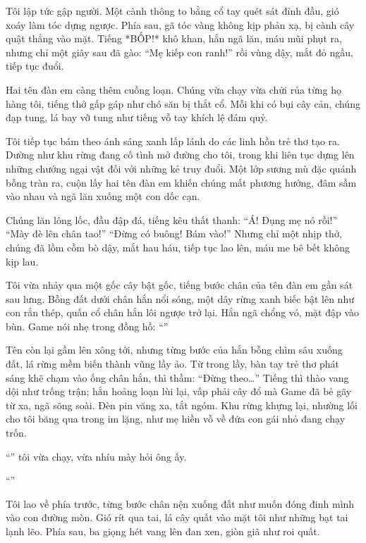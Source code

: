 \documentclass[../main.tex]{subfiles}
\begin{document}
Tôi lập tức gập người. Một cành thông to bằng cổ tay quét sát đỉnh đầu, gió xoáy làm tóc dựng ngược. Phía sau, gã tóc vàng không kịp phản xạ, bị cành cây quật thẳng vào mặt. Tiếng *BỐP!* khô khan, hắn ngã lăn, máu mũi phụt ra, nhưng chỉ một giây sau đã gào: ``Mẹ kiếp con ranh!'' rồi vùng dậy, mắt đỏ ngầu, tiếp tục đuổi.

Hai tên đàn em càng thêm cuồng loạn. Chúng vừa chạy vừa chửi rủa từng họ hàng tôi, tiếng thở gấp gáp như chó săn bị thắt cổ. Mỗi khi có bụi cây cản, chúng đạp tung, lá bay vỡ tung như tiếng vỗ tay khích lệ đám quỷ.

Tôi tiếp tục bám theo ánh sáng xanh lấp lánh do các linh hồn trẻ thơ tạo ra. Dường như khu rừng đang cố tình mở đường cho tôi, trong khi liên tục dựng lên những chướng ngại vật đối với những kẻ truy đuổi. Một lớp sương mù đặc quánh bỗng tràn ra, cuộn lấy hai tên đàn em khiến chúng mất phương hướng, đâm sầm vào nhau và ngã lăn xuống một con dốc cạn.

Chúng lăn lông lốc, đầu đập đá, tiếng kêu thất thanh: ``Á! Đụng mẹ nó rồi!'' ``Mày đè lên chân tao!'' ``Đừng có buông! Bám vào!'' Nhưng chỉ một nhịp thở, chúng đã lồm cồm bò dậy, mắt hau háu, tiếp tục lao lên, máu me bê bết không kịp lau.

Tôi vừa nhảy qua một gốc cây bật gốc, tiếng bước chân của tên đàn em gần sát sau lưng. Bỗng đất dưới chân hắn nổi sóng, một dây rừng xanh biếc bật lên như con rắn thép, quấn cổ chân hắn lôi ngược trở lại. Hắn ngã chổng vó, mặt đập vào bùn. Game nói nhẹ trong đồng hồ: ``''

Tên còn lại gầm lên xông tới, nhưng từng bước của hắn bỗng chìm sâu xuống đất, lá rừng mềm biến thành vũng lầy ảo. Từ trong lầy, bàn tay trẻ thơ phát sáng khẽ chạm vào ống chân hắn, thì thầm: ``Đừng theo\dots'' Tiếng thì thào vang dội như trống trận; hắn hoảng loạn lùi lại, vấp phải cây đổ mà Game đã bẻ gãy từ xa, ngã sõng soài. Đèn pin văng xa, tắt ngóm. Khu rừng khựng lại, nhường lối cho tôi băng qua trong im lặng, như mẹ hiền vỗ về đứa con gái nhỏ đang chạy trốn.

``'' tôi vừa chạy, vừa nhíu mày hỏi ông ấy.

``''

Tôi lao về phía trước, từng bước chân nện xuống đất như muốn đóng đinh mình vào con đường mòn. Gió rít qua tai, lá cây quất vào mặt tôi như những bạt tai lạnh lẽo. Phía sau, ba giọng hét vang lên đan xen, giòn giã như roi quất.
\end{document}
